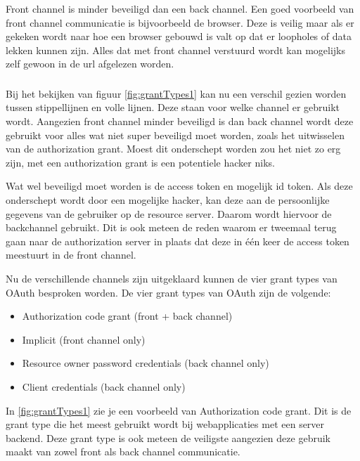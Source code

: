 \subsubsection{}
Front channel is minder beveiligd dan een back channel. Een goed voorbeeld van front channel communicatie is bijvoorbeeld de browser. Deze is veilig maar als er gekeken wordt naar hoe een browser gebouwd is valt op dat er loopholes of data lekken kunnen zijn. Alles dat met front channel verstuurd wordt kan mogelijks zelf gewoon in de url afgelezen worden.
\subsubsection{}
Bij het bekijken van figuur \ref{fig:grantTypes1} kan nu een verschil gezien worden tussen stippellijnen en volle lijnen. Deze staan voor welke channel er gebruikt wordt. Aangezien front channel minder beveiligd is dan back channel wordt deze gebruikt voor alles wat niet super beveiligd moet worden, zoals het uitwisselen van de authorization grant. Moest dit onderschept worden zou het niet zo erg zijn, met een authorization grant is een potentiele hacker niks. 

Wat wel beveiligd moet worden is de access token en mogelijk id token. Als deze onderschept wordt door een mogelijke hacker, kan deze aan de persoonlijke gegevens van de gebruiker op de resource server. Daarom wordt hiervoor de backchannel gebruikt. Dit is ook meteen de reden waarom er tweemaal terug gaan naar de authorization server in plaats dat deze in één keer de access token meestuurt in de front channel.

Nu de verschillende channels zijn uitgeklaard kunnen de vier grant types van OAuth besproken worden. De vier grant types van OAuth zijn de volgende:
\begin{itemize}
	\item Authorization code grant (front + back channel)
	\item Implicit (front channel only)
	\item Resource owner password credentials (back channel only)
	\item Client credentials (back channel only)
\end{itemize}
In \ref{fig:grantTypes1} zie je een voorbeeld van Authorization code grant. Dit is de grant type die het meest gebruikt wordt bij webapplicaties met een server backend. Deze grant type is ook meteen de veiligste aangezien deze gebruik maakt van zowel front als back channel communicatie.

